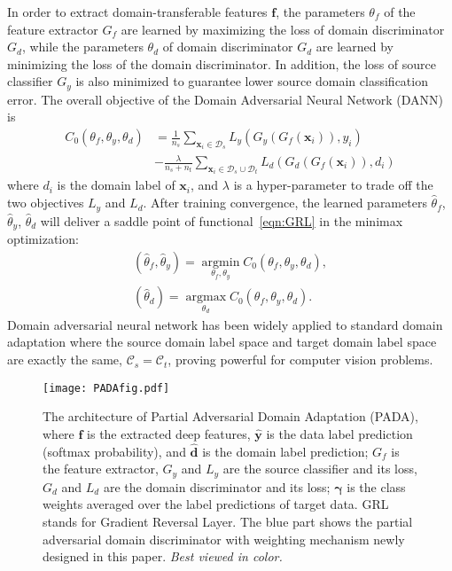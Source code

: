 \documentclass[runningheads]{llncs}
\begin{document}
In order to extract domain-transferable features $\mathbf{f}$, the parameters $\theta_f$ of the feature extractor $G_f$ are learned by maximizing the loss of domain discriminator $G_d$, while the parameters $\theta_d$ of domain discriminator $G_d$ are learned by minimizing the loss of the domain discriminator. In addition, the loss of source classifier $G_y$ is also minimized to guarantee lower source domain classification error. The overall objective of the Domain Adversarial Neural Network (DANN) \cite{cite:ICML15RevGrad} is
\begin{equation}\label{eqn:GRL}
\begin{aligned}
	C_{0} \left( {{\theta _f},{\theta _y},{\theta _d}} \right) & = \frac{1}{{{n_s}}}\sum\limits_{{{\mathbf{x}}_i} \in {\mathcal{D}_s}} {{L_y}\left( {{G_y}\left( {{G_f}\left( {{{\mathbf{x}}_i}} \right)} \right),{y_i}} \right)} \\
	         & - \frac{\lambda }{{{n_s} + {n_t}}}\sum\limits_{{{\mathbf{x}}_i} \in {{\mathcal{D}_s} \cup {\mathcal{D}_t}}} {{L_d}\left( {{G_d}\left( {{G_f}\left( {{{\mathbf{x}}_i}} \right)} \right),{d_i}} \right)} 
\end{aligned}         
\end{equation}
where $d_i$ is the domain label of $\mathbf{x}_i$, and $\lambda$ is a hyper-parameter to trade off the two objectives $L_y$ and $L_d$.
After training convergence, the learned parameters $\hat\theta_f$, $\hat\theta_y$, $\hat\theta_d$ will deliver a saddle point of functional~\eqref{eqn:GRL} in the minimax optimization: 
\begin{equation}\label{eqn:param1}
\begin{gathered}
     (\hat\theta_f, \hat\theta_y) =  \mathop {\arg\min }\limits_{{\theta _f},{\theta _y}} C_0 \left( {{\theta _f},{\theta _y},{\theta _d}} \right), \\
     (\hat\theta_d) =  \mathop {\arg\max }\limits_{{\theta_d}} C_0 \left( {{\theta _f},{\theta _y},{\theta _d}} \right).
\end{gathered}
\end{equation}
Domain adversarial neural network has been widely applied to standard domain adaptation where the source domain label space and target domain label space are exactly the same, $\mathcal{C}_s = \mathcal{C}_t$, proving powerful for computer vision problems.

\begin{figure}[tbp]
  \centering
  \texttt{[image: PADAfig.pdf]}
  \caption{The architecture of Partial Adversarial Domain Adaptation (PADA), where $\mathbf{f}$ is the extracted deep features, ${\hat{\mathbf{y}}}$ is the data label prediction (softmax probability), and ${\hat{\mathbf{d}}}$ is the domain label prediction; $G_f$ is the feature extractor, $G_y$ and $L_y$ are the source classifier and its loss, $G_d$ and $L_d$ are the domain discriminator and its loss; ${\bm\gamma}$ is the class weights averaged over the label predictions of target data. GRL stands for Gradient Reversal Layer. The blue part shows the partial adversarial domain discriminator with weighting mechanism newly designed in this paper. \emph{Best viewed in color.}}
   \label{fig:PADA}
\end{figure}
\end{document}
